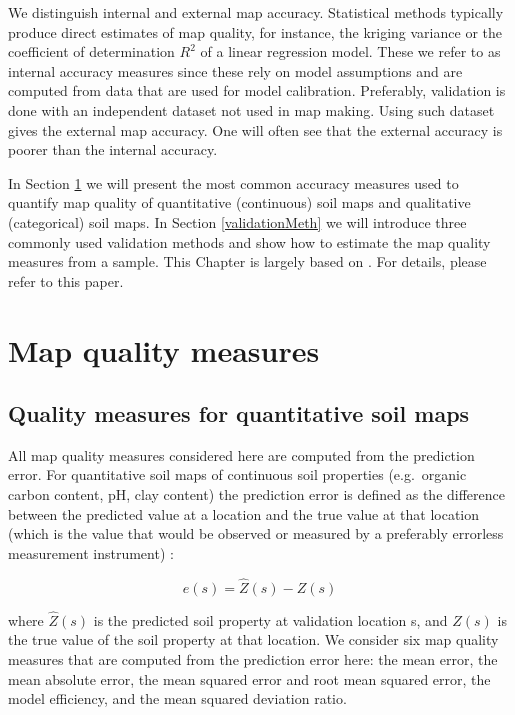 \documentclass[10pt,b5paper,]{book}
\theoremstyle{definition}
\theoremstyle{definition}
\theoremstyle{definition}
\theoremstyle{remark}
\begin{document}
We distinguish internal and external map accuracy. Statistical methods
typically produce direct estimates of map quality, for instance, the
kriging variance or the coefficient of determination \(R^2\) of a linear
regression model. These we refer to as internal accuracy measures since
these rely on model assumptions and are computed from data that are used
for model calibration. Preferably, validation is done with an
independent dataset not used in map making. Using such dataset gives the
external map accuracy. One will often see that the external accuracy is
poorer than the internal accuracy.

In Section \ref{QualMeasures} we will present the most common accuracy
measures used to quantify map quality of quantitative (continuous) soil
maps and qualitative (categorical) soil maps. In Section
\ref{validationMeth} we will introduce three commonly used validation
methods and show how to estimate the map quality measures from a sample.
This Chapter is largely based on \citet{brus2011sampling}. For details,
please refer to this paper.

\hypertarget{QualMeasures}{%
\section{Map quality measures}\label{QualMeasures}}

\hypertarget{quality-measures-for-quantitative-soil-maps}{%
\subsection{Quality measures for quantitative soil
maps}\label{quality-measures-for-quantitative-soil-maps}}

All map quality measures considered here are computed from the
prediction error. For quantitative soil maps of continuous soil
properties (e.g.~organic carbon content, pH, clay content) the
prediction error is defined as the difference between the predicted
value at a location and the true value at that location (which is the
value that would be observed or measured by a preferably errorless
measurement instrument) \citep{brus2011sampling}:

\begin{equation}
e(s) = \hat{Z}(s) - Z(s)
\end{equation}

where \({\hat{Z}(s)}\) is the predicted soil property at validation
location s, and \({Z(s)}\) is the true value of the soil property at
that location. We consider six map quality measures that are computed
from the prediction error here: the mean error, the mean absolute error,
the mean squared error and root mean squared error, the model
efficiency, and the mean squared deviation ratio.
\end{document}
